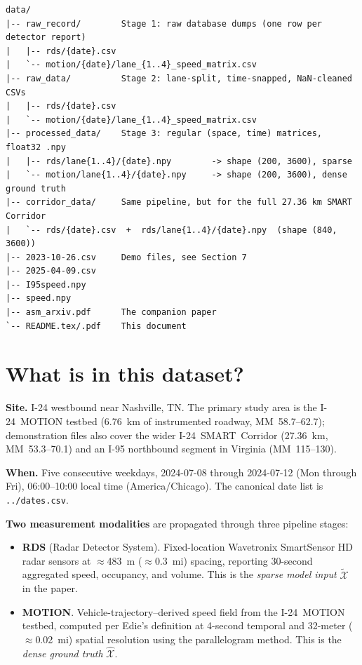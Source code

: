 \documentclass[11pt]{article}
\newcommand{\code}[1]{\texttt{#1}}
\newcommand{\filename}[1]{\textcolor{accent}{\code{#1}}}
\begin{document}
\begin{lstlisting}[basicstyle=\ttfamily\small,frame=none,backgroundcolor=\color{white}]
data/
|-- raw_record/        Stage 1: raw database dumps (one row per detector report)
|   |-- rds/{date}.csv
|   `-- motion/{date}/lane_{1..4}_speed_matrix.csv
|-- raw_data/          Stage 2: lane-split, time-snapped, NaN-cleaned CSVs
|   |-- rds/{date}.csv
|   `-- motion/{date}/lane_{1..4}_speed_matrix.csv
|-- processed_data/    Stage 3: regular (space, time) matrices, float32 .npy
|   |-- rds/lane{1..4}/{date}.npy        -> shape (200, 3600), sparse
|   `-- motion/lane{1..4}/{date}.npy     -> shape (200, 3600), dense ground truth
|-- corridor_data/     Same pipeline, but for the full 27.36 km SMART Corridor
|   `-- rds/{date}.csv  +  rds/lane{1..4}/{date}.npy  (shape (840, 3600))
|-- 2023-10-26.csv     Demo files, see Section 7
|-- 2025-04-09.csv
|-- I95speed.npy
|-- speed.npy
|-- asm_arxiv.pdf      The companion paper
`-- README.tex/.pdf    This document
\end{lstlisting}

\section{What is in this dataset?}

\textbf{Site.} I-24 westbound near Nashville, TN. The primary study area is
the I-24~MOTION testbed (6.76~km of instrumented roadway, MM~58.7--62.7);
demonstration files also cover the wider I-24~SMART~Corridor (27.36~km,
MM~53.3--70.1) and an I-95 northbound segment in Virginia (MM~115--130).

\textbf{When.} Five consecutive weekdays, 2024-07-08 through 2024-07-12 (Mon
through Fri), 06:00--10:00 local time (America/Chicago). The canonical date
list is \filename{../dates.csv}.

\textbf{Two measurement modalities} are propagated through three pipeline
stages:

\begin{itemize}[leftmargin=*]
  \item \textbf{RDS} (Radar Detector System). Fixed-location Wavetronix
    SmartSensor HD radar sensors at $\approx$483~m ($\approx$0.3~mi) spacing,
    reporting 30-second aggregated speed, occupancy, and volume. This is the
    \emph{sparse model input} $\tilde{\mathcal{X}}$ in the paper.
  \item \textbf{MOTION}. Vehicle-trajectory--derived speed field from the
    I-24~MOTION testbed, computed per Edie's definition at 4-second temporal
    and 32-meter ($\approx$0.02~mi) spatial resolution using the parallelogram
    method. This is the \emph{dense ground truth} $\hat{\mathcal{X}}$.
\end{itemize}
\end{document}
